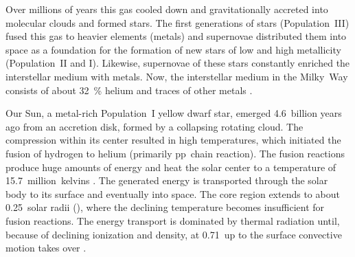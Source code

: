 Over millions of years this gas cooled down and gravitationally accreted into molecular clouds and formed stars. The first generations of stars (Population~III) fused this gas to heavier elements (metals) and supernovae distributed them into space as a foundation for the formation of new stars of low and high metallicity (Population~II and I). Likewise, supernovae of these stars constantly enriched the interstellar medium with metals. Now, the interstellar medium in the Milky~Way consists of about \SI{32}{\percent} helium and traces of other metals \citep{Danziger1970}.

Our Sun, a metal-rich Population~I yellow dwarf star, emerged 4.6~billion years ago \citep{Bahcall1995} from an accretion disk, formed by a collapsing rotating cloud. The compression within its center resulted in high temperatures, which initiated the fusion of hydrogen to helium (primarily pp~chain reaction). The fusion reactions produce huge amounts of energy and heat the solar center to a temperature of 15.7~million~kelvins \citep{Christensen-Dalsgaard1996}. The generated energy is transported through the solar body to its surface and eventually into space.
The core region extends to about 0.25~solar radii (\Rsun), where the declining temperature becomes insufficient for fusion reactions. The energy transport is dominated by thermal radiation until, because of declining ionization and density, at 0.71\,\Rsun{} up to the surface convective motion takes over \citep{Christensen-Dalsgaard1991}. %

